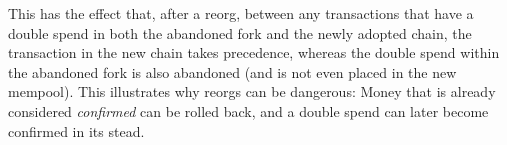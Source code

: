 This has the effect that, after a reorg, between any transactions that have a double spend in both
the abandoned fork and the newly adopted chain, the transaction in the new
chain takes precedence, whereas the double spend within the abandoned fork is also abandoned
(and is not even placed in the new mempool). This illustrates why reorgs can be dangerous:
Money that is already considered \emph{confirmed} can be rolled back, and a double spend can later
become confirmed in its stead.

